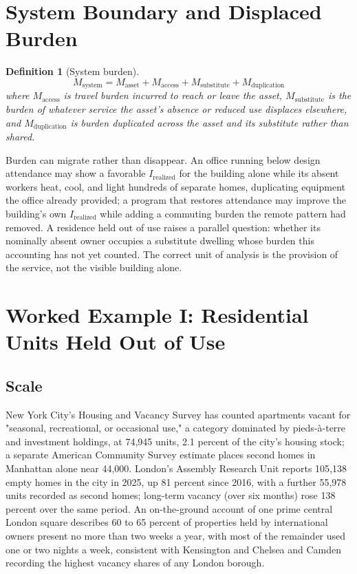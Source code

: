 \documentclass[11pt]{article}
\newtheorem{definition}{Definition}[section]
\begin{document}
\section{System Boundary and Displaced Burden}

\begin{definition}[System burden]
\[
M_{\text{system}} = M_{\text{asset}} + M_{\text{access}} + M_{\text{substitute}} + M_{\text{duplication}}
\]
where $M_{\text{access}}$ is travel burden incurred to reach or leave the asset, $M_{\text{substitute}}$ is the burden of whatever service the asset's absence or reduced use displaces elsewhere, and $M_{\text{duplication}}$ is burden duplicated across the asset and its substitute rather than shared.
\end{definition}

Burden can migrate rather than disappear. An office running below design attendance may show a favorable $I_{\text{realized}}$ for the building alone while its absent workers heat, cool, and light hundreds of separate homes, duplicating equipment the office already provided; a program that restores attendance may improve the building's own $I_{\text{realized}}$ while adding a commuting burden the remote pattern had removed. A residence held out of use raises a parallel question: whether its nominally absent owner occupies a substitute dwelling whose burden this accounting has not yet counted. The correct unit of analysis is the provision of the service, not the visible building alone.

\section{Worked Example I: Residential Units Held Out of Use}

\subsection{Scale}

New York City's Housing and Vacancy Survey has counted apartments vacant for "seasonal, recreational, or occasional use," a category dominated by pieds-\`a-terre and investment holdings, at 74{,}945 units, 2.1 percent of the city's housing stock; a separate American Community Survey estimate places second homes in Manhattan alone near 44{,}000. London's Assembly Research Unit reports 105{,}138 empty homes in the city in 2025, up 81 percent since 2016, with a further 55{,}978 units recorded as second homes; long-term vacancy (over six months) rose 138 percent over the same period. An on-the-ground account of one prime central London square describes 60 to 65 percent of properties held by international owners present no more than two weeks a year, with most of the remainder used one or two nights a week, consistent with Kensington and Chelsea and Camden recording the highest vacancy shares of any London borough.
\end{document}
